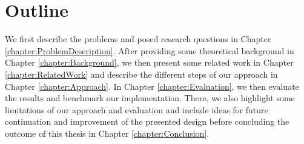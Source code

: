 \section{Outline}\label{sec:intro:outline}

We first describe the problems and posed research questions in Chapter \ref{chapter:ProblemDescription}.
After providing some theoretical background in Chapter \ref{chapter:Background}, we then present some related work in Chapter \ref{chapter:RelatedWork} and describe the different steps of our approach in Chapter \ref{chapter:Approach}.
In Chapter \ref{chapter:Evaluation}, we then evaluate the results and benchmark our implementation. There, we also highlight some limitations of our approach and evaluation and include ideas for future continuation and improvement of the presented design before concluding the outcome of this thesis in Chapter \ref{chapter:Conclusion}.
